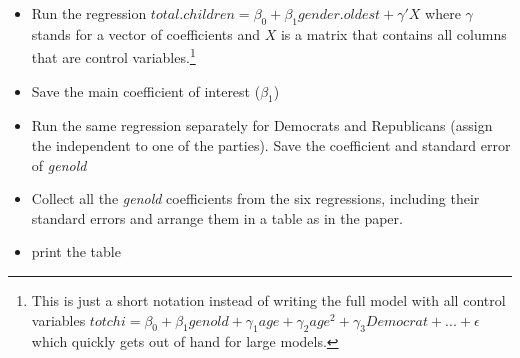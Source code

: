 \documentclass[]{article}
\providecommand{\tightlist}{%
  \setlength{\itemsep}{0pt}\setlength{\parskip}{0pt}}
\let\rmarkdownfootnote\footnote%
\def\footnote{\protect\rmarkdownfootnote}
\begin{document}
\begin{itemize}
\tightlist
\item
  Run the regression
  \(total.children = \beta_0 + \beta_1 gender.oldest + \gamma'X\) where
  \(\gamma\) stands for a vector of coefficients and \(X\) is a matrix
  that contains all columns that are control
  variables.\footnote{This is just a short notation instead of writing the full model with all control variables $totchi = \beta_0 + \beta_1 genold + \gamma_1 age + \gamma_2 age^2 + \gamma_3 Democrat + ... + \epsilon$ which quickly gets out of hand for large models.}
\item
  Save the main coefficient of interest (\(\beta_1\))
\item
  Run the same regression separately for Democrats and Republicans
  (assign the independent to one of the parties). Save the coefficient
  and standard error of \emph{genold}
\item
  Collect all the \emph{genold} coefficients from the six regressions,
  including their standard errors and arrange them in a table as in the
  paper.
\item
  print the table
\end{itemize}
\end{document}

